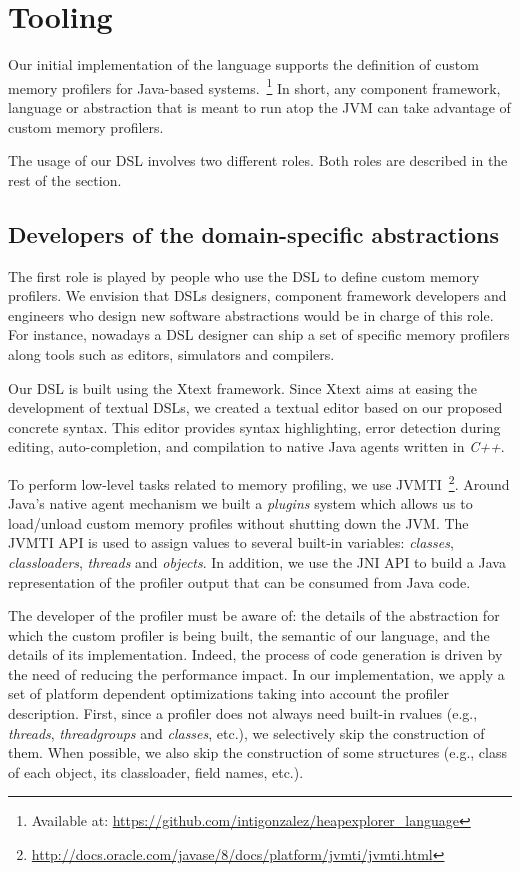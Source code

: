 \section{Tooling}\label{sec:dsl-implementation}

Our initial implementation of the language supports the definition of custom memory profilers for Java-based systems.~\footnote{Available at: \url{https://github.com/intigonzalez/heapexplorer\_language}}
In short, any component framework, language or abstraction that is meant to run atop the JVM can take advantage of custom memory profilers.

The usage of our DSL involves two different roles.
Both roles are described in the rest of the section.


\subsection{Developers of the domain-specific abstractions}

The first role is played by people who use the DSL to define custom memory profilers.
We envision that DSLs designers, component framework developers and engineers who design new software abstractions would be in charge of this role.
For instance, nowadays a DSL designer can ship a set of specific memory profilers along tools such as editors, simulators and compilers. 

Our DSL is built using the Xtext framework.
Since Xtext aims at easing the development of textual DSLs, we created a textual editor based on our proposed concrete syntax.
This editor provides syntax highlighting, error detection during editing, auto-completion, and compilation to native Java agents written in \textit{C++}.

To perform low-level tasks related to memory profiling, we use JVMTI~\footnote{\url{http://docs.oracle.com/javase/8/docs/platform/jvmti/jvmti.html}}.
Around Java's native agent mechanism we built a \textit{plugins} system which allows us to load/unload custom memory profiles without shutting down the JVM.
The JVMTI API is used to assign values to several built-in variables: \textit{classes}, \textit{classloaders}, \textit{threads} and \textit{objects}.
In addition, we use the JNI API to build a Java representation of the profiler output that can be consumed from Java code.

The developer of the profiler must be aware of: the details of the abstraction for which the custom profiler is being built, the semantic of our language, and the details of its implementation.
Indeed, the process of code generation is driven by the need of reducing the performance impact.
In our implementation, we apply a set of platform dependent optimizations taking into account the profiler description.
First, since a profiler does not always need built-in rvalues (e.g., \textit{threads}, \textit{threadgroups} and \textit{classes}, etc.), we selectively skip the construction of them.
When possible, we also skip the construction of some structures (e.g., class of each object, its classloader, field names, etc.).

